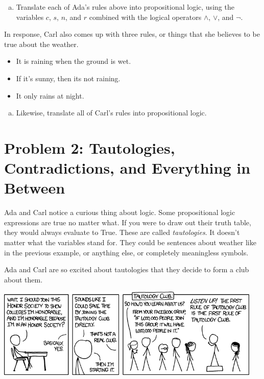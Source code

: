 \documentclass{article}
\begin{document}
\begin{enumerate}[(a)]
\item
Translate each of Ada's rules above into propositional logic,
using the variables $c$, $s$, $n$, and $r$ combined with the
logical operators $\land$, $\lor$, and $\lnot$.
\end{enumerate}

In response, Carl also comes up with three rules, or things that she
believes to be true about the weather.

\begin{itemize}
\item It is raining when the ground is wet.
\item If it's sunny, then its not raining.
\item It only rains at night.
\end{itemize}

\begin{enumerate}[(b)]
\item
Likewise, translate all of Carl's rules into propositional logic.
\end{enumerate}

\section{Problem 2: Tautologies, Contradictions, and Everything in Between}

Ada and Carl notice a curious thing about logic. Some propositional
logic expressions are true no matter what. If you were to draw out their
truth table, they would always evaluate to \textsf{True}.
These are called \emph{tautologies}. It doesn't matter what the variables
stand for. They could be sentences about weather like in the previous
example, or anything else, or completely meaningless symbols.

Ada and Carl are so excited about tautologies that they decide
to form a club about them.

\includegraphics[width=5in]{xkcd_honor_societies.png}
\end{document}
